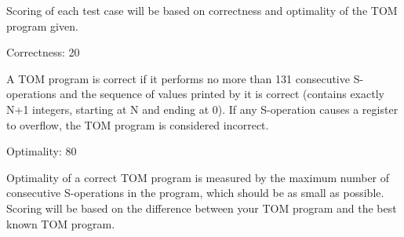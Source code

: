 Scoring of each test case will be based on correctness and optimality of the TOM program given.

Correctness: 20%

A TOM program is correct if it performs no more than 131 consecutive S-operations and the sequence of values printed by it is correct (contains exactly N+1 integers,  starting at N and ending at 0). If any S-operation causes a register to overflow, the TOM program is considered incorrect.

Optimality: 80%

Optimality of a correct TOM program is measured by the maximum number of consecutive S-operations in the program, which should be as small as possible. Scoring will be based on the difference between your TOM program and the best known TOM program.